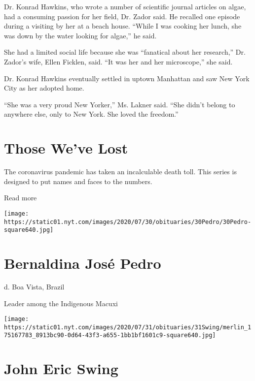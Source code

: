 Dr. Konrad Hawkins, who wrote a number of scientific journal articles on
algae, had a consuming passion for her field, Dr. Zador said. He
recalled one episode during a visiting by her at a beach house. ``While
I was cooking her lunch, she was down by the water looking for algae,''
he said.

She had a limited social life because she was ``fanatical about her
research,'' Dr. Zador's wife, Ellen Ficklen, said. ``It was her and her
microscope,'' she said.

Dr. Konrad Hawkins eventually settled in uptown Manhattan and saw New
York City as her adopted home.

``She was a very proud New Yorker,'' Ms. Lakner said. ``She didn't
belong to anywhere else, only to New York. She loved the freedom.''

\href{https://www.nytimes.com/interactive/2020/obituaries/people-died-coronavirus-obituaries.html?action=click\&pgtype=Article\&state=default\&region=BELOW_MAIN_CONTENT\&context=covid_obits_promo}{}

\hypertarget{those-weve-lost}{%
\section{Those We've Lost}\label{those-weve-lost}}

The coronavirus pandemic has taken an incalculable death toll. This
series is designed to put names and faces to the numbers.

Read more

\texttt{[image: https://static01.nyt.com/images/2020/07/30/obituaries/30Pedro/30Pedro-square640.jpg]}

\hypertarget{bernaldina-josuxe9-pedro}{%
\section{Bernaldina José Pedro}\label{bernaldina-josuxe9-pedro}}

d. Boa Vista, Brazil

Leader among the Indigenous Macuxi

\texttt{[image: https://static01.nyt.com/images/2020/07/31/obituaries/31Swing/merlin\_175167783\_8913bc90-0d64-43f3-a655-1bb1bf1601c9-square640.jpg]}

\hypertarget{john-eric-swing}{%
\section{John Eric Swing}\label{john-eric-swing}}

